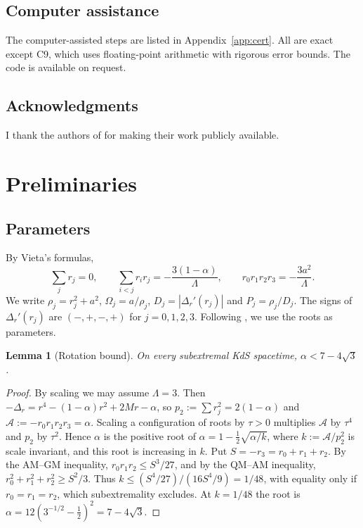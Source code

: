 \documentclass[11pt]{amsart}
\newtheorem{lemma}[theorem]{Lemma}
\theoremstyle{definition}
\theoremstyle{remark}
\numberwithin{equation}{section}
\begin{document}
\subsection*{Computer assistance}
The computer-assisted steps are listed in Appendix~\ref{app:cert}. All are exact except C9, which uses floating-point
arithmetic with rigorous error bounds. The code is available on request.

\subsection*{Acknowledgments}
I thank the authors of \cite{Hin26,HPV25} for making their work publicly available.

\section{Preliminaries}\label{sec:prelim}

\subsection{Parameters}
By Vieta's formulas,
\begin{equation}\label{eq:vieta}
\sum_j r_j=0,\qquad \sum_{i<j}r_ir_j=-\frac{3(1-\alpha)}{\Lambda},\qquad r_0r_1r_2r_3=-\frac{3a^2}{\Lambda}.
\end{equation}
We write $\rho_j=r_j^2+a^2$, $\Omega_j=a/\rho_j$, $D_j=|\Delta_r'(r_j)|$ and $P_j=\rho_j/D_j$. The signs of
$\Delta_r'(r_j)$ are $(-,+,-,+)$ for $j=0,1,2,3$. Following \cite[\S6, footnote~5]{Hin26}, we use the roots as
parameters.

\begin{lemma}[Rotation bound]\label{lem:alpha}
On every subextremal KdS spacetime, $\alpha<7-4\sqrt3$.
\end{lemma}
\begin{proof}
By scaling we may assume $\Lambda=3$. Then $-\Delta_r=r^4-(1-\alpha)r^2+2Mr-\alpha$, so $p_2:=\sum r_j^2=2(1-\alpha)$
and $\mathcal A:=-r_0r_1r_2r_3=\alpha$. Scaling a configuration of roots by $\tau>0$ multiplies $\mathcal A$ by $\tau^4$ and
$p_2$ by $\tau^2$. Hence $\alpha$ is the positive root of $\alpha=1-\frac12\sqrt{\alpha/k}$, where $k:=\mathcal A/p_2^2$
is scale invariant, and this root is increasing in $k$. Put $S=-r_3=r_0+r_1+r_2$. By the AM--GM inequality,
$r_0r_1r_2\le S^3/27$, and by the QM--AM inequality, $r_0^2+r_1^2+r_2^2\ge S^2/3$. Thus
$k\le(S^4/27)/(16S^4/9)=1/48$, with equality only if $r_0=r_1=r_2$, which subextremality excludes. At $k=1/48$ the
root is $\alpha=12(3^{-1/2}-\frac12)^2=7-4\sqrt3$.
\end{proof}
\end{document}

